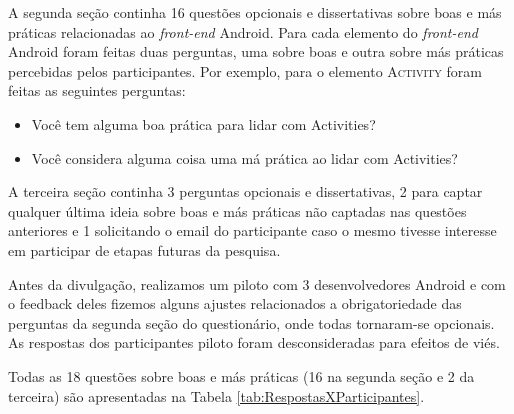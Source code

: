 A segunda seção continha 16 questões opcionais e dissertativas sobre boas e más práticas relacionadas ao \textit{front-end} Android. Para cada elemento do \textit{front-end} Android foram feitas duas perguntas, uma sobre boas e outra sobre más práticas percebidas pelos participantes. Por exemplo, para o elemento \textsc{Activity} foram feitas as seguintes perguntas:

\begin{itemize} 
	\item Você tem alguma boa prática para lidar com Activities?
	\item Você considera alguma coisa uma má prática ao lidar com Activities? 
\end{itemize}

A terceira seção continha 3 perguntas opcionais e dissertativas, 2 para captar qualquer última ideia sobre boas e más práticas não captadas nas questões anteriores e 1 solicitando o email do participante caso o mesmo tivesse interesse em participar de etapas futuras da pesquisa. 

Antes da divulgação, realizamos um piloto com 3 desenvolvedores Android e com o feedback deles fizemos alguns ajustes relacionados a obrigatoriedade das perguntas da segunda seção do questionário, onde todas tornaram-se opcionais. As respostas dos participantes piloto foram desconsideradas para efeitos de viés. 

Todas as 18 questões sobre boas e más práticas (16 na segunda seção e 2 da terceira) são apresentadas na Tabela \ref{tab:RespostasXParticipantes}.

